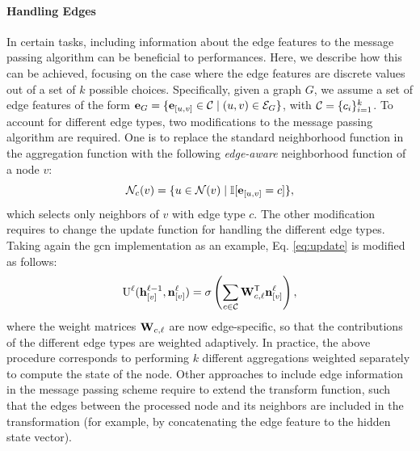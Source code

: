 \paragraph{Handling Edges} 
In certain tasks, including information about the edge features to the message passing algorithm can be beneficial to performances. Here, we describe how this can be achieved, focusing on the case where the edge features are discrete values out of a set of $k$ possible choices. Specifically, given a graph $G$, we assume a set of edge features of the form $\Vector{e}_G = \Set{\Elem{e}{u,v} \in \Cal{C} \mid (u, v) \in \Cal{E}_G}$, with $\Cal{C} = \Set{c_i}_{i=1}^k$. To account for different edge types, two modifications to the message passing algorithm are required. One is to replace the standard neighborhood function in the aggregation function with the following \emph{edge-aware} neighborhood function of a node $v$:
$$\Cal{N}_c(v) = \Set{u \in \Cal{N}(v) \mid \mathbb{I}[\Elem{e}{u, v} = c]},$$
which selects only neighbors of $v$ with edge type $c$. The other modification requires to change the update function for handling the different edge types. Taking again the \gls{gcn} implementation as an example, Eq. \ref{eq:update} is modified as follows:
\begin{align*}
    \Fun{U}^{\ell}(\Elem{h}{v}^{\ell-1}, \Elem{n}{v}^{\ell}) = \sigma\Paren{\sum_{c \in \Cal{C}} \Matrix{W}^{\Transpose}_{c,\ell} \Elem{n}{v}^{\ell}},
\end{align*}
where the weight matrices $\Matrix{W}_{c,\ell}$ are now edge-specific, so that the contributions of the different edge types are weighted adaptively. In practice, the above procedure corresponds to performing $k$ different aggregations weighted separately to compute the state of the node. Other approaches to include edge information in the message passing scheme require to extend the transform function, such that the edges between the processed node and its neighbors are included in the transformation (for example, by concatenating the edge feature to the hidden state vector).

